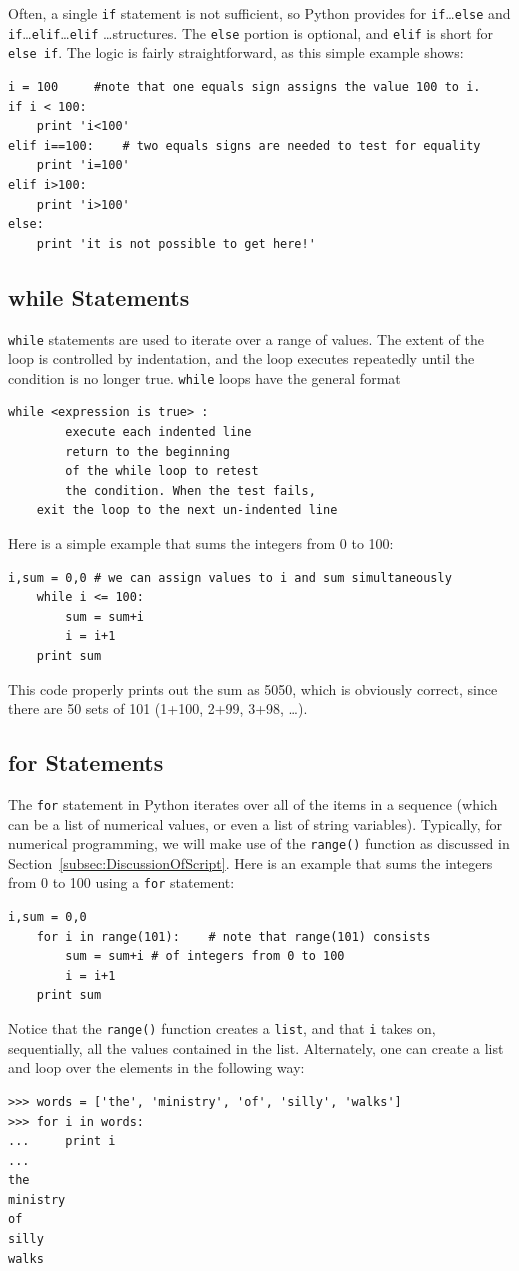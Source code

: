Often, a single \verb!if! statement is not sufficient, so Python provides for \verb!if!\ldots \verb!else!
 and \verb!if!\ldots \verb!elif!\ldots \verb!elif! \ldots structures. The \verb!else! portion is optional, and \verb!elif! is short for \verb!else if!. The logic is fairly straightforward, as this simple example shows: 
\begin{lstlisting}[frame=none]
i = 100		#note that one equals sign assigns the value 100 to i.
if i < 100:
	print 'i<100'
elif i==100:	# two equals signs are needed to test for equality
	print 'i=100'
elif i>100:
	print 'i>100'
else:
	print 'it is not possible to get here!'	
\end{lstlisting}


\subsection{while Statements}
\label{subsec-while}
\verb!while! statements are used to iterate over a range of values. The extent of the loop is controlled by indentation, and the loop executes repeatedly until the condition is no longer true. \verb!while! loops have the general format
\begin{lstlisting}[frame=none]
	while <expression is true> :
		execute each indented line
		return to the beginning
		of the while loop to retest 
		the condition. When the test fails,
	exit the loop to the next un-indented line
\end{lstlisting}
Here is a simple example that sums the integers from 0 to 100:
\begin{lstlisting}[frame=none]
	i,sum = 0,0	# we can assign values to i and sum simultaneously
	while i <= 100:
		sum = sum+i
		i = i+1		
	print sum
\end{lstlisting}
This code properly prints out the sum as 5050, which is obviously correct, since there are 50 sets of 101 (1+100, 2+99, 3+98, \ldots). 

\subsection{for Statements}
\label{subsec-for}
The \verb!for! statement in Python iterates over all of the items in a sequence (which can be a list of numerical values, or even a list of string variables). Typically, for numerical programming, we will make use of the \verb!range()! function as discussed in Section~\ref{subsec:DiscussionOfScript}. Here is an example that sums the integers from 0 to 100 using a \verb!for! statement:
\begin{lstlisting}[frame=none]
	i,sum = 0,0	
	for i in range(101):	# note that range(101) consists
		sum = sum+i	# of integers from 0 to 100
		i = i+1		
	print sum
\end{lstlisting}
Notice that the \texttt{range()} function creates a \texttt{list}, and that \texttt{i} takes on, sequentially, all the values contained in the list. Alternately, one can create a list and loop over the elements in the following way:
\begin{lstlisting}
>>> words = ['the', 'ministry', 'of', 'silly', 'walks']
>>> for i in words:
...     print i
...
the
ministry
of
silly
walks	
\end{lstlisting}


